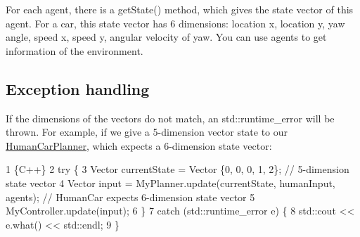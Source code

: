 For each agent, there is a {\ttfamily get\+State()} method, which gives the state vector of this agent. For a car, this state vector has 6 dimensions\+: location x, location y, yaw angle, speed x, speed y, angular velocity of yaw. You can use {\ttfamily agents} to get information of the environment.

\subsection*{Exception handling}

If the dimensions of the vectors do not match, an {\ttfamily std\+::runtime\+\_\+error} will be thrown. For example, if we give a 5-\/dimension vector {\ttfamily state} to our {\ttfamily \hyperlink{classHumanCarPlanner}{Human\+Car\+Planner}}, which expects a 6-\/dimension state vector\+: 
\begin{DoxyCode}
1 \{C++\}
2 try \{
3     Vector currentState = Vector \{0, 0, 0, 1, 2\}; // 5-dimension state vector
4     Vector input = MyPlanner.update(currentState, humanInput, agents); // HumanCar expects 6-dimension
       state vector
5     MyController.update(input);
6 \}
7 catch (std::runtime\_error e) \{
8     std::cout << e.what() << std::endl;
9 \}
\end{DoxyCode}
 
